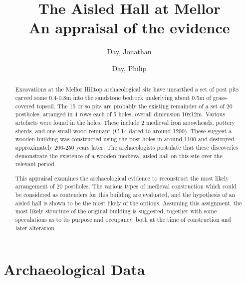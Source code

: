 \documentclass[letterpaper,11pt,titlepage]{article}
\begin{document}
\title{The Aisled Hall at Mellor \\ An appraisal of the evidence}
\author{Day, Jonathan}
\author{Day, Philip}
\maketitle
\begin{abstract}
Excavations at the Mellor Hilltop archaeological site have unearthed a set of post pits carved some 0.4-0.8m into the sandstone bedrock underlying about 0.5m of grass-covered topsoil. The 15 or so pits are probably the existing remainder of a set of 20 postholes, arranged in 4 rows each of 5 holes, overall dimension 10x12m. Various artefacts were found in the holes. These include 2 medieval iron arrowheads, pottery sherds, and one small wood remnant (C-14 dated to around 1200). These suggest a wooden building was constructed using the post-holes in around 1100 and destroyed approximately 200-250 years later. The archaeologists postulate that these discoveries demonstrate the existence of a wooden medieval aisled hall on this site over the relevant period.

This appraisal examines the archaeological evidence to reconstruct the most likely arrangement of 20 postholes. The various types of medieval construction which could be considered as contenders for this building are evaluated, and the hypothesis of an aisled hall is shown to be the most likely of the options. Assuming this assignment, the most likely structure of the original building is suggested, together with some speculations as to its purpose and occupancy, both at the time of construction and later alteration.
\end{abstract}
\section{Archaeological Data}
\end{document}
